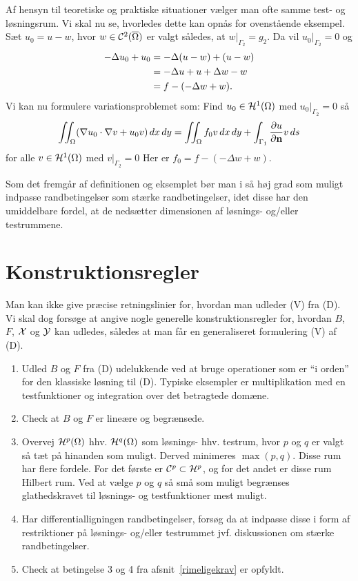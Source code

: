 \begin{example}
Af hensyn til teoretiske og praktiske situationer vælger man ofte samme test- og 
løsningsrum. Vi skal nu se, hvorledes dette kan opnås for ovenstående
eksempel. Sæt $u_0=u-w$, hvor $w\in{\cal C}^2(\overline{\Omega})$ er 
valgt således, at $w|_{\Gamma_2}=g_2$. Da vil $u_0|_{\Gamma_2}=0$ og
\begin{align}
  -\Delta u_0 + u_0 &= -\Delta (u-w) + (u-w) \\ 
  &=  -\Delta u + u + \Delta w - w \notag \\
  &=  f - (-\Delta w + w). \notag
\end{align}
Vi kan nu formulere variationsproblemet som: Find 
$u_0\in {\mathcal H}^1(\Omega)$ med $u_0|_{\Gamma_2}=0$ så
\begin{equation}
  \iint_{\Omega} (\nabla u_0 \cdot \nabla v + u_0v)\, dx\, dy =
  \iint_{\Omega} f_0v\, dx\, dy +
  \int_{\Gamma_1} \frac{\partial u}{\partial \mathbf{n}}v\, ds
\end{equation}
for alle $v\in {\mathcal H}^1(\Omega)$ med $v|_{\Gamma_2}=0$
Her er $f_0 = f -(- \Delta w +w)$.
\end{example}
Som det fremgår af definitionen og eksemplet bør man i så høj grad som
muligt ind\-passe randbetingelser som stærke randbetingelser, idet disse
har den umiddelbare fordel, at de nedsætter dimensionen af løsnings-
og/eller testrummene.

\section{Konstruktionsregler}
Man kan ikke give præcise retningslinier for, hvordan man udleder
(V) fra (D). Vi skal dog forsøge at angive nogle generelle 
konstruktionsregler for, hvordan $B$, $F$, $\mathcal{X}$ og $\mathcal{Y}$ kan
udledes, således at man får en generaliseret formulering (V) af (D).
\begin{enumerate}
  \item Udled $B$ og $F$ fra (D) udelukkende ved at bruge operationer
        som er ``i orden'' for den klassiske løsning til (D). Typiske
        eksempler er multiplikation med en testfunktioner og integration
        over det betragtede domæne.
  \item Check at  $B$ og $F$ er lineære og begrænsede.
  \item Overvej $\mathcal H^p(\Omega)$ hhv. $\mathcal H^q(\Omega)$  som løsnings- hhv.
        testrum, hvor $p$ og $q$ er valgt så tæt på hinanden som
        muligt. Derved minimeres $\max (p,q)$. Disse rum har
        flere fordele. For det første er ${\mathcal C}^p\subset\mathcal H^p$, og for
        det andet er disse rum Hilbert rum. Ved at vælge $p$ og $q$ så
        små som muligt begrænses glathedskravet til løsnings- og
        testfunktioner mest muligt. 
  \item Har differentialligningen randbetingelser, forsøg da at
        indpasse disse i form af restriktioner på løsnings- og/eller
        testrummet jvf. diskussionen om stærke randbetingelser.
  \item Check at betingelse 3 og 4 fra afsnit~\ref{rimeligekrav} er opfyldt.
\end{enumerate}

